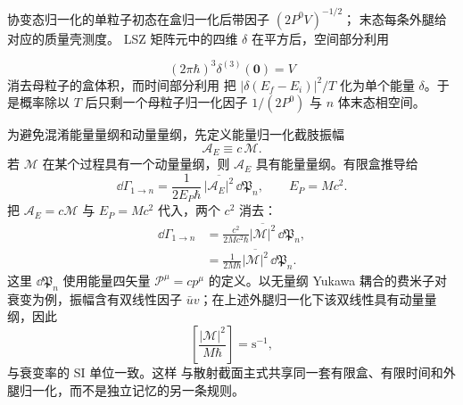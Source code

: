 \begin{derivation}[单粒子衰变率的归一化]
协变态归一化的单粒子初态在盒归一化后带因子 $(2P^0V)^{-1/2}$； 末态每条外腿给对应的质量壳测度。 LSZ 矩阵元中的四维 $\delta$ 在平方后，空间部分利用

\begin{equation*}
 (2\pi\hbar)^3\delta^{(3)}(\mathbf0)=V
\end{equation*}
消去母粒子的盒体积，而时间部分利用  把 $|\delta(E_f-E_i)|^2/T$ 化为单个能量 $\delta$。于是概率除以 $T$ 后只剩一个母粒子归一化因子 $1/(2P^0)$ 与 $n$ 体末态相空间。

为避免混淆能量量纲和动量量纲，先定义能量归一化截肢振幅
\begin{equation*}
 \mathcal A_E\equiv c\,\mathcal M.
\end{equation*}
若 $\mathcal M$ 在某个过程具有一个动量量纲，则 $\mathcal A_E$ 具有能量量纲。有限盒推导给
\begin{equation*}
 \dd\Gamma_{1\to n}
 =\frac{1}{2E_P\hbar}\,
 \overline{|\mathcal A_E|^2}\,\dd\mathfrak P_n,
 \qquad E_P=Mc^2.
 \end{equation*}
把 $\mathcal A_E=c\mathcal M$ 与 $E_P=Mc^2$ 代入，两个 $c^2$ 消去：
\begin{align*}
 \dd\Gamma_{1\to n}
 &=\frac{c^2}{2Mc^2\hbar}
 \overline{|\mathcal M|^2}\,\dd\mathfrak P_n,\\
 &={
 \frac{1}{2M\hbar}
 \overline{|\mathcal M|^2}\,\dd\mathfrak P_n.}
 \end{align*}
这里 $\dd\mathfrak P_n$ 使用能量四矢量 $\mathcal P^\mu=cp^\mu$ 的定义。以无量纲 Yukawa 耦合的费米子对衰变为例，振幅含有双线性因子 $\bar u v$；在上述外腿归一化下该双线性具有动量量纲，因此
\begin{equation*}
 \left[\frac{|\mathcal M|^2}{M\hbar}\right]
 =\mathrm{s^{-1}},
\end{equation*}
与衰变率的 SI 单位一致。这样  与散射截面主式共享同一套有限盒、有限时间和外腿归一化，而不是独立记忆的另一条规则。
\end{derivation}

